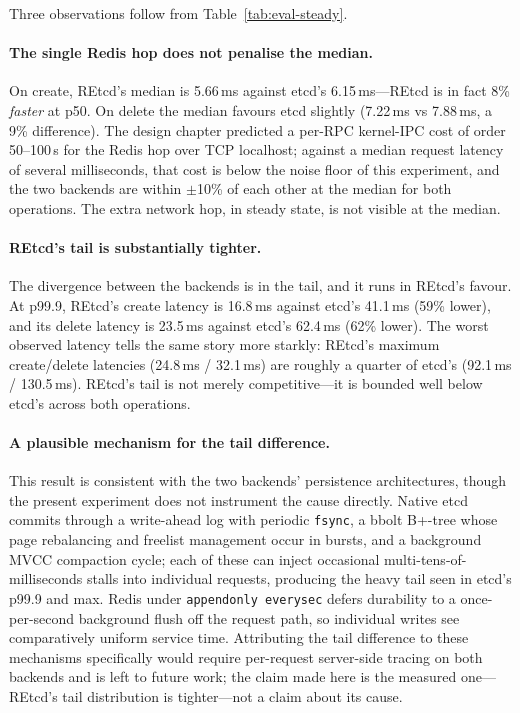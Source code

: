 Three observations follow from Table~\ref{tab:eval-steady}.

\paragraph{The single Redis hop does not penalise the median.}
On create, REtcd's median is 5.66\,ms against etcd's 6.15\,ms---REtcd is in fact 8\% \emph{faster} at p50. On delete the median favours etcd slightly (7.22\,ms vs 7.88\,ms, a 9\% difference). The design chapter predicted a per-RPC kernel-IPC cost of order 50--100\,\textmu{}s for the Redis hop over TCP localhost; against a median request latency of several milliseconds, that cost is below the noise floor of this experiment, and the two backends are within $\pm$10\% of each other at the median for both operations. The extra network hop, in steady state, is not visible at the median.

\paragraph{REtcd's tail is substantially tighter.}
The divergence between the backends is in the tail, and it runs in REtcd's favour. At p99.9, REtcd's create latency is 16.8\,ms against etcd's 41.1\,ms (59\% lower), and its delete latency is 23.5\,ms against etcd's 62.4\,ms (62\% lower). The worst observed latency tells the same story more starkly: REtcd's maximum create/delete latencies (24.8\,ms / 32.1\,ms) are roughly a quarter of etcd's (92.1\,ms / 130.5\,ms). REtcd's tail is not merely competitive---it is bounded well below etcd's across both operations.

\paragraph{A plausible mechanism for the tail difference.}
This result is consistent with the two backends' persistence architectures, though the present experiment does not instrument the cause directly. Native etcd commits through a write-ahead log with periodic \texttt{fsync}, a bbolt B+-tree whose page rebalancing and freelist management occur in bursts, and a background MVCC compaction cycle; each of these can inject occasional multi-tens-of-milliseconds stalls into individual requests, producing the heavy tail seen in etcd's p99.9 and max. Redis under \texttt{appendonly everysec} defers durability to a once-per-second background flush off the request path, so individual writes see comparatively uniform service time. Attributing the tail difference to these mechanisms specifically would require per-request server-side tracing on both backends and is left to future work; the claim made here is the measured one---REtcd's tail distribution is tighter---not a claim about its cause.

